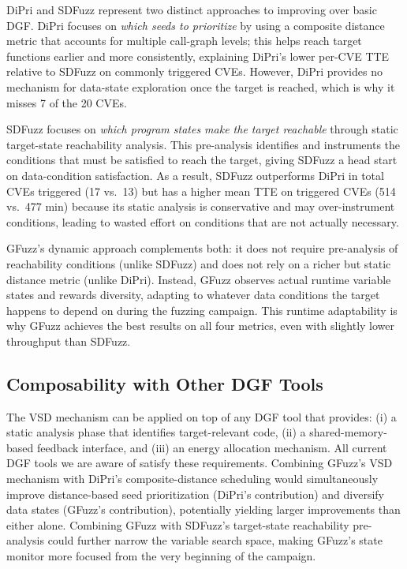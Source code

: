 \documentclass[preprint,12pt,3p]{elsarticle}
\begin{document}
DiPri and SDFuzz represent two distinct approaches to improving over
basic DGF.  DiPri focuses on \emph{which seeds to prioritize} by using
a composite distance metric that accounts for multiple call-graph levels;
this helps reach target functions earlier and more consistently, explaining
DiPri's lower per-CVE TTE relative to SDFuzz on commonly triggered CVEs.
However, DiPri provides no mechanism for data-state exploration once the
target is reached, which is why it misses 7 of the 20 CVEs.

SDFuzz focuses on \emph{which program states make the target reachable}
through static target-state reachability analysis.  This pre-analysis
identifies and instruments the conditions that must be satisfied to reach
the target, giving SDFuzz a head start on data-condition satisfaction.
As a result, SDFuzz outperforms DiPri in total CVEs triggered (17 vs.\ 13)
but has a higher mean TTE on triggered CVEs (514 vs.\ 477 min) because
its static analysis is conservative and may over-instrument conditions,
leading to wasted effort on conditions that are not actually necessary.

GFuzz's dynamic approach complements both: it does not require pre-analysis
of reachability conditions (unlike SDFuzz) and does not rely on a richer but
static distance metric (unlike DiPri).  Instead, GFuzz observes actual
runtime variable states and rewards diversity, adapting to whatever data
conditions the target happens to depend on during the fuzzing campaign.
This runtime adaptability is why GFuzz achieves the best results on all
four metrics, even with slightly lower throughput than SDFuzz.

\subsection{Composability with Other DGF Tools}

The VSD mechanism can be applied on top of any DGF tool that provides: (i) a
static analysis phase that identifies target-relevant code, (ii) a
shared-memory-based feedback interface, and (iii) an energy allocation
mechanism.  All current DGF tools we are aware of satisfy these requirements.
Combining GFuzz's VSD mechanism with DiPri's composite-distance scheduling
would simultaneously improve distance-based seed prioritization (DiPri's
contribution) and diversify data states (GFuzz's contribution), potentially
yielding larger improvements than either alone.  Combining GFuzz with
SDFuzz's target-state reachability pre-analysis could further narrow
the variable search space, making GFuzz's state monitor more focused from
the very beginning of the campaign.
\end{document}
